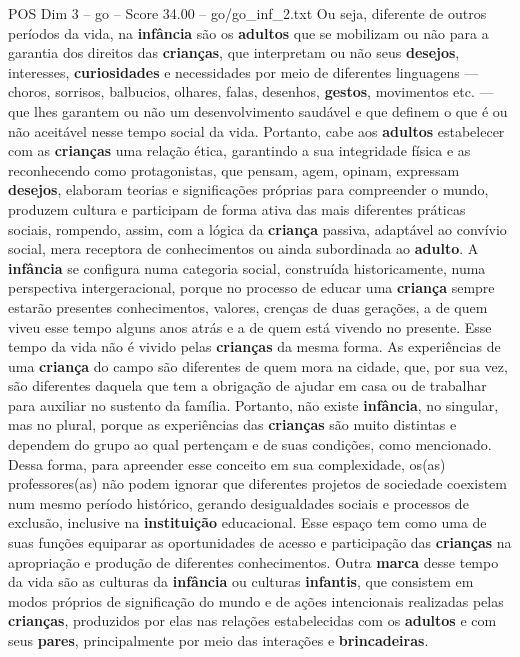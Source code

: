 \begin{textsample}{POS Dim 3 – go – Score 34.00 – go/go\_inf\_2.txt}
Ou seja, diferente de outros períodos da vida, na \textbf{infância} são os \textbf{adultos} que se mobilizam ou não para a garantia dos direitos das \textbf{crianças}, que interpretam ou não seus \textbf{desejos}, interesses, \textbf{curiosidades} e necessidades por meio de diferentes linguagens — choros, sorrisos, balbucios, olhares, falas, desenhos, \textbf{gestos}, movimentos etc. — que lhes garantem ou não um desenvolvimento saudável e que definem o que é ou não aceitável nesse tempo social da vida.
Portanto, cabe aos \textbf{adultos} estabelecer com as \textbf{crianças} uma relação ética, garantindo a sua integridade física e as reconhecendo como protagonistas, que pensam, agem, opinam, expressam \textbf{desejos}, elaboram teorias e significações próprias para compreender o mundo, produzem cultura e participam de forma ativa das mais diferentes práticas sociais, rompendo, assim, com a lógica da \textbf{criança} passiva, adaptável ao convívio social, mera receptora de conhecimentos ou ainda subordinada ao \textbf{adulto}.
A \textbf{infância} se configura numa categoria social, construída historicamente, numa perspectiva intergeracional, porque no processo de educar uma \textbf{criança} sempre estarão presentes conhecimentos, valores, crenças de duas gerações, a de quem viveu esse tempo alguns anos atrás e a de quem está vivendo no presente.
Esse tempo da vida não é vivido pelas \textbf{crianças} da mesma forma.
As experiências de uma \textbf{criança} do campo são diferentes de quem mora na cidade, que, por sua vez, são diferentes daquela que tem a obrigação de ajudar em casa ou de trabalhar para auxiliar no sustento da família.
Portanto, não existe \textbf{infância}, no singular, mas no plural, porque as experiências das \textbf{crianças} são muito distintas e dependem do grupo ao qual pertençam e de suas condições, como mencionado.
Dessa forma, para apreender esse conceito em sua complexidade, os(as) professores(as) não podem ignorar que diferentes projetos de sociedade coexistem num mesmo período histórico, gerando desigualdades sociais e processos de exclusão, inclusive na \textbf{instituição} educacional.
Esse espaço tem como uma de suas funções equiparar as oportunidades de acesso e participação das \textbf{crianças} na apropriação e produção de diferentes conhecimentos.
Outra \textbf{marca} desse tempo da vida são as culturas da \textbf{infância} ou culturas \textbf{infantis}, que consistem em modos próprios de significação do mundo e de ações intencionais realizadas pelas \textbf{crianças}, produzidos por elas nas relações estabelecidas com os \textbf{adultos} e com seus \textbf{pares}, principalmente por meio das interações e \textbf{brincadeiras}.

\end{textsample}
